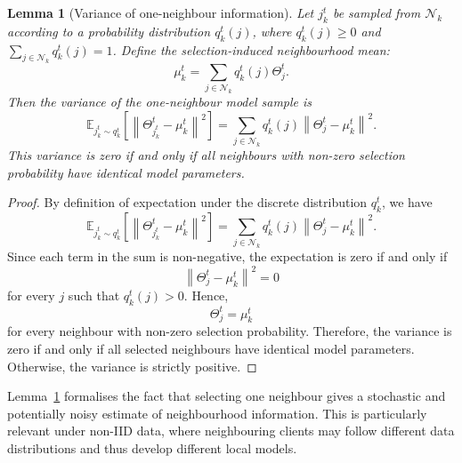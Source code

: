 \documentclass[conference]{IEEEtran}
\newtheorem{lemma}{Lemma}
\begin{document}
\begin{lemma}[Variance of one-neighbour information]
\label{lem:variance_one_neighbour}
Let $j_k^t$ be sampled from $\mathcal{N}_k$ according to a probability distribution $q_k^t(j)$, where $q_k^t(j)\geq 0$ and $\sum_{j\in\mathcal{N}_k}q_k^t(j)=1$. Define the selection-induced neighbourhood mean:
\begin{equation}
\mu_k^t
=
\sum_{j\in\mathcal{N}_k}
q_k^t(j)\Theta_j^t.
    \label{eq:auto-044}
\end{equation}
Then the variance of the one-neighbour model sample is
\begin{equation}
\mathbb{E}_{j_k^t\sim q_k^t}
\left[
\left\|
\Theta_{j_k^t}^t-\mu_k^t
\right\|^2
\right]
=
\sum_{j\in\mathcal{N}_k}
q_k^t(j)
\left\|
\Theta_j^t-\mu_k^t
\right\|^2.
    \label{eq:auto-045}
\end{equation}
This variance is zero if and only if all neighbours with non-zero selection probability have identical model parameters.
\end{lemma}

\begin{proof}
By definition of expectation under the discrete distribution $q_k^t$, we have
\begin{equation}
\mathbb{E}_{j_k^t\sim q_k^t}
\left[
\left\|
\Theta_{j_k^t}^t-\mu_k^t
\right\|^2
\right]
=
\sum_{j\in\mathcal{N}_k}
q_k^t(j)
\left\|
\Theta_j^t-\mu_k^t
\right\|^2.
    \label{eq:auto-046}
\end{equation}
Since each term in the sum is non-negative, the expectation is zero if and only if
\begin{equation}
\left\|
\Theta_j^t-\mu_k^t
\right\|^2=0
    \label{eq:auto-047}
\end{equation}
for every $j$ such that $q_k^t(j)>0$. Hence,
\begin{equation}
\Theta_j^t=\mu_k^t
    \label{eq:auto-048}
\end{equation}
for every neighbour with non-zero selection probability. Therefore, the variance is zero if and only if all selected neighbours have identical model parameters. Otherwise, the variance is strictly positive.
\end{proof}

Lemma~\ref{lem:variance_one_neighbour} formalises the fact that selecting one neighbour gives a stochastic and potentially noisy estimate of neighbourhood information. This is particularly relevant under non-IID data, where neighbouring clients may follow different data distributions and thus develop different local models.
\end{document}
